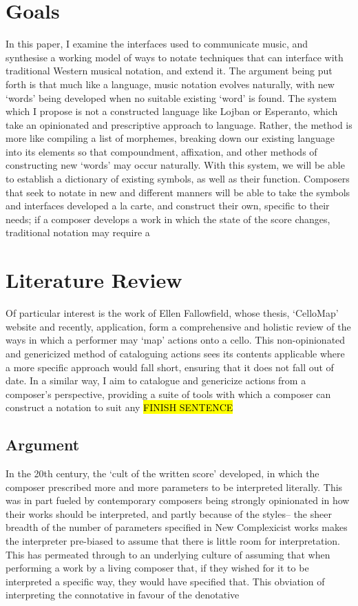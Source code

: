\section{Goals}

In this paper, I examine the interfaces used to communicate music, and synthesise a working model of ways to notate techniques that can interface with traditional Western musical notation, and extend it.
The argument being put forth is that much like a language, music notation evolves naturally, with new `words' being developed when no suitable existing `word' is found.
The system which I propose is not a constructed language like Lojban or Esperanto, which take an opinionated and prescriptive approach to language. 
Rather, the method is more like compiling a list of morphemes, breaking down our existing language into its elements so that compoundment, affixation, and other methods of constructing new `words' may occur naturally.
With this system, we will be able to establish a dictionary of existing symbols, as well as their function.
Composers that seek to notate in new and different manners will be able to take the symbols and interfaces developed a la carte, and construct their own, specific to their needs; if a composer develops a work in which the state of the score changes, traditional notation may require a 

\section{Literature Review}
Of particular interest is the work of Ellen Fallowfield, whose thesis, `CelloMap' website and recently, application, form a comprehensive and holistic review of the ways in which a performer may `map' actions onto a cello.\autocite[]{fallowfieldCelloMapHandbook2009,fallowfieldCelloMap}
This non-opinionated and genericized method of cataloguing actions sees its contents applicable where a more specific approach would fall short, ensuring that it does not fall out of date.
In a similar way, I aim to catalogue and genericize actions from a composer's perspective, providing a suite of tools with which a composer can construct a notation to suit any \hl{FINISH SENTENCE}

\subsection{Argument}
In the 20th century, the `cult of the written score' developed, in which the composer prescribed more and more parameters to be interpreted literally.\autocite[]{citation very much needed}
This was in part fueled by contemporary composers being strongly opinionated in how their works should be interpreted, and partly because of the styles-- the sheer breadth of the number of parameters specified in New Complexicist works makes the interpreter pre-biased to assume that there is little room for interpretation.
This has permeated through to an underlying culture of assuming that when performing a work by a living composer that, if they wished for it to be interpreted a specific way, they would have specified that.
This obviation of interpreting the connotative in favour of the denotative 

